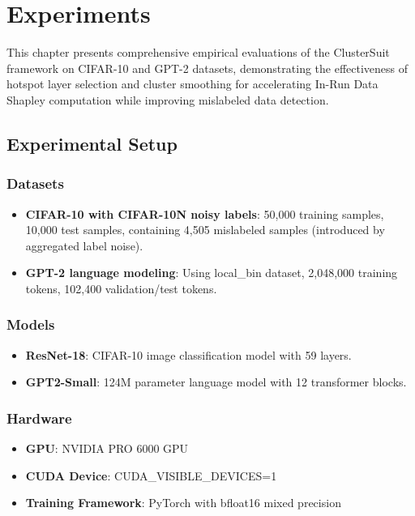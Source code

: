 \documentclass[12pt,a4paper]{report}
\begin{document}
\chapter{Experiments}
\label{chap:experiments}

This chapter presents comprehensive empirical evaluations of the ClusterSuit framework on CIFAR-10 and GPT-2 datasets, demonstrating the effectiveness of hotspot layer selection and cluster smoothing for accelerating In-Run Data Shapley computation while improving mislabeled data detection.

\section{Experimental Setup}
\label{sec:exp_setup}

\subsection{Datasets}
\label{sec:datasets}

\begin{itemize}
    \item \textbf{CIFAR-10 with CIFAR-10N noisy labels}: 50,000 training samples, 10,000 test samples, containing 4,505 mislabeled samples (introduced by aggregated label noise).
    
    \item \textbf{GPT-2 language modeling}: Using local\_bin dataset, 2,048,000 training tokens, 102,400 validation/test tokens.
\end{itemize}

\subsection{Models}
\label{sec:models}

\begin{itemize}
    \item \textbf{ResNet-18}: CIFAR-10 image classification model with 59 layers.
    \item \textbf{GPT2-Small}: 124M parameter language model with 12 transformer blocks.
\end{itemize}

\subsection{Hardware}
\label{sec:hardware}

\begin{itemize}
    \item \textbf{GPU}: NVIDIA PRO 6000 GPU
    \item \textbf{CUDA Device}: CUDA\_VISIBLE\_DEVICES=1
    \item \textbf{Training Framework}: PyTorch with bfloat16 mixed precision
\end{itemize}
\end{document}
